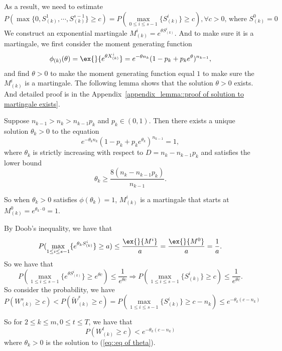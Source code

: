 As a result, we need to estimate 
$$P\left( \max\{0,S^1_{(k)},\cdots,S^{s-1}_{(k)}\} \ge c\right)=P\left( \max_{0\leq i\leq s-1}\{S^i_{(k)}\} \ge c\right), \forall c>0 ,\,\text{where }S^0_{(k)}=0$$
We construct an exponential martingale $M^i_{(k)} = e^{\theta S^i_{(k)}}$. And to make sure it is a martingale, we first consider the moment generating function
$$\phi_{(k)}(\theta) = \ex{}{e^{\theta X_{(k)}^i}}= e^{-\theta n_{k}}(1-p_k+p_ke^{\theta})^{n_{k-1}},$$
and find $\theta>0$ to make the moment generating function equal $1$ to make sure the $M^i_{(k)}$ is a martingale. The following lemma shows that the solution $\theta>0$ exists. And detailed proof is in the Appendix~\ref{appendix_lemma::proof of solution to martingale exists}.
\begin{lemma}\label{lemma::solution to martingale exists}
Suppose \(n_{k-1} > n_k > n_{k-1} p_k\) and \(p_k \in (0, 1)\). Then there exists a unique solution \(\theta_k > 0\) to the equation
\begin{equation}
    e^{-\theta_k n_k} (1 - p_k + p_k e^{\theta_k})^{n_{k-1}} = 1, \label{eq::eq of theta}
\end{equation}
where \(\theta_k\) is strictly increasing with respect to \(D = n_k - n_{k-1} p_k\) and satisfies the lower bound
\[
\theta_k \geq \frac{8 (n_k - n_{k-1} p_k)}{n_{k-1}}.
\]
\end{lemma}
So when $\theta_k>0$ satisfies $\phi(\theta_k)=1$, $M^i_{(k)}$ is a martingale that starts at $M^0_{(k)}= e^{\theta_k \cdot 0}=1 $.

By Doob's inequality, we have that
$$P(\max_{1\leq i
\leq s-1}\{ e^{\theta_k S^i_{(k)}} \}\geq a)\leq \frac{\ex{}{M^i}}{a} = \frac{\ex{}{M^0}}{a}= \frac{1}{a}.$$
So we have that
$$P(\max_{1\leq i
\leq s-1}\{ e^{\theta S^i_{(k)}}\} \geq e^{\theta c})\leq \frac{1}{e^{\theta c}}  \Rightarrow P(\max_{1\leq i
\leq s-1}\{  S^i_{(k)}\} \geq c)\leq \frac{1}{e^{\theta c}} .$$
So consider the probability, we have 
$$P\left(  W^s_{(k)}\geq c  \right) <P\left(  \tilde{W}^s_{(k)}\geq c  \right) = P(\max_{1\leq i
\leq s-1}\{  S^i_{(k)}\} \geq c - n_k)\leq e^{-\theta_k (c - n_k)}$$

So for $2\leq k\leq m, 0\leq t\leq T$, we have that
$$P\left(  W^t_{(k)}\geq c  \right)< e^{-\theta_k (c - n_k)}$$
where $\theta_k>0$ is the solution to (\ref{eq::eq of theta}).

